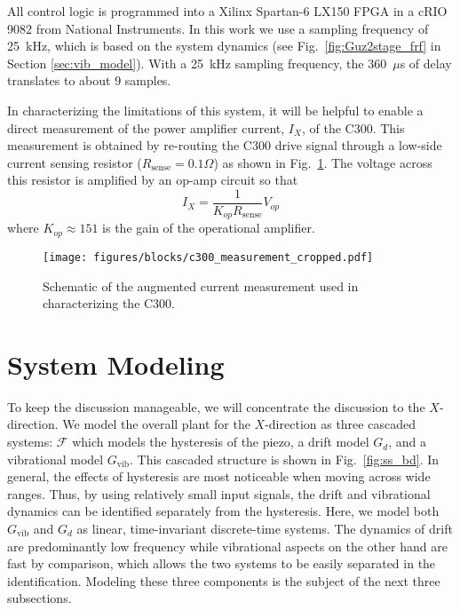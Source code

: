 \documentclass[twocolumn,twoside]{IEEEtran}
\newcommand{\Gv}{\ensuremath{G_{\text{vib}}}\xspace}
\begin{document}
All control logic is programmed into a Xilinx Spartan-6 LX150 FPGA in a cRIO 9082 from National Instruments.
In this work we use a sampling frequency of 25~kHz, which is based on the system dynamics (see Fig.~\ref{fig:Guz2stage_frf} in Section \ref{sec:vib_model}). With a 25~kHz sampling frequency, the 360~$\mu$s of delay translates to about 9 samples.

In characterizing the limitations of this system, it will be helpful to enable a direct measurement of the power amplifier current, $I_X$, of the C300. This measurement is obtained by re-routing the C300 drive signal through a low-side current sensing resistor (${R_{\text{sense}}=0.1\Omega}$) as shown in Fig.~\ref{fig:c300_meas}.
The voltage across this resistor is amplified by an op-amp circuit so that
\begin{equation}
I_{X} = \frac{1}{K_{op}R_{\text{sense}}}V_{op}\nonumber
\end{equation}
where $K_{op}\approx 151$ is the gain of the operational amplifier.


\begin{figure}
    \texttt{[image: figures/blocks/c300\_measurement\_cropped.pdf]}
    \caption{Schematic of the augmented current measurement used in characterizing the C300.}
    \label{fig:c300_meas}
\end{figure}
\section{System Modeling}
To keep the discussion manageable, we will concentrate the discussion to the $X$-direction. We model the overall plant for the $X$-direction as three cascaded systems: $\mathcal{F}$ which models the hysteresis of the piezo, a drift model $G_d$, and a vibrational model $\Gv$. This cascaded structure is shown in Fig.~\ref{fig:ss_bd}. In general, the effects of hysteresis are most noticeable when moving across wide ranges. Thus, by using relatively small input signals, the drift and vibrational dynamics can be identified separately from the hysteresis. Here, we model both $\Gv$ and $G_d$ as linear, time-invariant discrete-time systems. The dynamics of drift are predominantly low frequency while vibrational aspects on the other hand are fast by comparison, which allows the two systems to be easily separated in the identification.
 Modeling these three components is the subject of the next three subsections.
\end{document}
